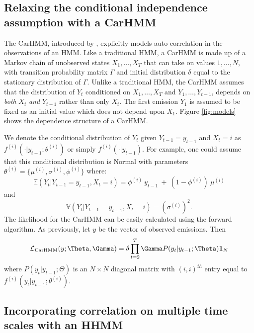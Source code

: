 \subsection{Relaxing the conditional independence assumption with a CarHMM}

The CarHMM, introduced by \citet{Lawler:2019}, explicitly models auto-correlation in the observations of an HMM. Like a traditional HMM, a CarHMM is made up of a Markov chain of unobserved states $X_1,\ldots, X_T$ that can take on values $1, \ldots, N$, with transition probability matrix $\Gamma$ and initial distribution $\delta$ equal to the stationary distribution of $\Gamma$. Unlike a traditional HMM, the CarHMM assumes that the distribution of $Y_t$ conditioned on $X_1,\ldots, X_T$ and $Y_1,\ldots, Y_{t-1}$, depends on \textit{both} $X_t$ \textit{and} $Y_{t-1}$ rather than only $X_t$. 
The first emission $Y_1$ is assumed to be fixed as an initial value which does not depend upon $X_1$. Figure \ref{fig:models} shows the dependence structure of a CarHMM.

%
We denote the conditional distribution of $Y_t$ given $Y_{t-1}= y_{t-1}$ and $ X_t=i$ as $f^{(i)}( \cdot | y_{t-1}; \theta^{(i)})$ or simply $f^{(i)}( \cdot | y_{t-1})$.
For example, one could assume that this conditional distribution is Normal with parameters $\theta^{(i)} = \{\mu^{(i)},\sigma^{(i)},\phi^{(i)}\}$ where:
%
\[
\mathbb{E}(Y_t|Y_{t-1} = y_{t-1},X_t=i) = \phi^{(i)} ~ y_{t-1} ~+ ~(1-\phi^{(i)})  ~\mu^{(i)}
\]
and
\[
\mathbb{V}(Y_t| Y_{t-1} =y_{t-1}, X_t = i) = (\sigma^{(i)})^2.
\]
%
The likelihood for the CarHMM can be easily calculated using the forward algorithm. As previously, let $y$ be the vector of observed emissions. Then
\begin{equation}
    \calL_{\text{CarHMM}}(y;\Theta,\Gamma) = \delta \prod_{t=2}^T \Gamma P(y_t|y_{t-1};\Theta) \mathbf{1}_N
    \label{CarHMM_likelihood}
\end{equation}
where
%
$P(y_t|y_{t-1};\Theta)$ is an $N \times N$ diagonal matrix with $(i,i)^{th}$ entry equal to $f^{(i)}(y_t|y_{t-1}; \theta^{(i)})$.

\subsection{Incorporating correlation on multiple time scales with an HHMM}

